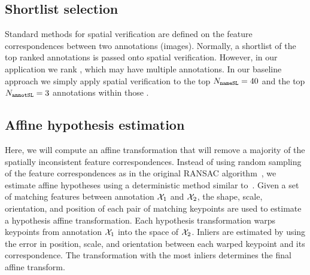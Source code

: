 
     \sver{}

    \subsection{Shortlist selection}
        Standard methods for spatial verification are defined on the feature correspondences between two
        annotations (images). Normally, a shortlist of the top ranked annotations is passed onto spatial
        verification. However, in our application we rank \names{}, which may have multiple annotations. In our
        baseline approach we simply apply spatial verification to the top $N_{\tt{nameSL}}=40$ \names{} and the top
        $N_{\tt{annotSL}}=3$ annotations within those \names{}.

    \subsection{Affine hypothesis estimation}
        Here, we will compute an affine transformation that will remove a majority of the spatially inconsistent
        feature correspondences. Instead of using random sampling of the feature correspondences as in the original
        RANSAC algorithm~\cite{hartley_multiple_2003}, we estimate affine hypotheses using a deterministic method
        similar to~\cite{philbin_object_2007, chum_homography_2012}. Given a set of matching features between
        annotation $\mathcal{X}_{1}$ and $\mathcal{X}_{2}$, the shape, scale, orientation, and position of each pair of matching
        keypoints are used to estimate a hypothesis affine transformation. Each hypothesis transformation warps
        keypoints from annotation $\mathcal{X}_{1}$ into the space of $\mathcal{X}_{2}$. Inliers are estimated by using the error
        in position, scale, and orientation between each warped keypoint and its correspondence. The transformation
        with the most inliers determines the final affine transform.

        \newcommand{\AffMat}{\mat{A}}
        \newcommand{\HypothSet}{\set{A}}
        \newcommand{\AffMatij}{\mat{A}_{i, j}}
        \newcommand{\HypothAffMat}{\hat{\mat{A}}}

